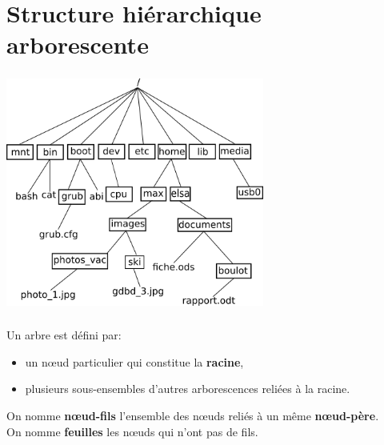 \documentclass[svgnames,11pt]{beamer}
\begin{document}
\section{Structure hiérarchique arborescente}
\begin{frame}
    \frametitle{}


    \begin{center}
        \centering
        \includegraphics[width=8.5cm]{ressources/arbre-linux.png}
    \end{center}
\end{frame}
\begin{frame}
    \frametitle{}

    \begin{aretenir}[]
        Un arbre est défini par:
        \begin{itemize}
            \item un nœud particulier qui constitue la \textbf{racine},
            \item plusieurs sous-ensembles d'autres arborescences reliées à la racine.
        \end{itemize}
        On nomme \textbf{nœud-fils} l'ensemble des nœuds reliés à un même \textbf{nœud-père}.\\
        On nomme \textbf{feuilles} les nœuds qui n'ont pas de fils.
    \end{aretenir}

\end{frame}
\end{document}
